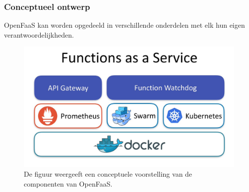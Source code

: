 \subsubsection{Conceptueel ontwerp}
OpenFaaS kan worden opgedeeld in verschillende onderdelen met elk hun eigen verantwoordelijkheden.
\begin{figure}
    \includegraphics[width=1\textwidth]{img/open-faas.jpg}
    \caption{De figuur weergeeft een conceptuele voorstelling van de componenten van OpenFaaS. \autocite{Ellis2019}}
    \label{fig:open-faas-conceptueel}  
\end{figure}

